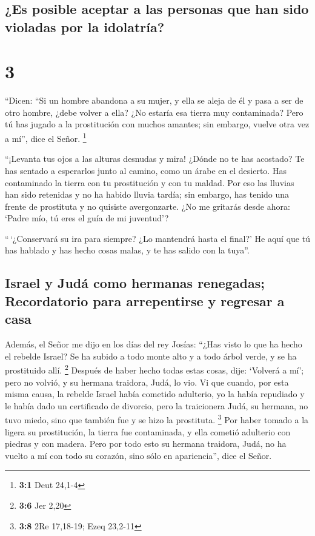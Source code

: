 \begin{paracol}{2}
\hypertarget{es-posible-aceptar-a-las-personas-que-han-sido-violadas-por-la-idolatruxeda}{%
\subsection{¿Es posible aceptar a las personas que han sido violadas por
la
idolatría?}\label{es-posible-aceptar-a-las-personas-que-han-sido-violadas-por-la-idolatruxeda}}

\hypertarget{section-4}{%
\section{3}\label{section-4}}

 ``Dicen: ``Si un hombre abandona a su mujer, y ella se
aleja de él y pasa a ser de otro hombre, ¿debe volver a ella? ¿No
estaría esa tierra muy contaminada? Pero tú has jugado a la prostitución
con muchos amantes; sin embargo, vuelve otra vez a mí'', dice el Señor.
\footnote{\textbf{3:1} Deut 24,1-4}

 ``¡Levanta tus ojos a las alturas desnudas y mira! ¿Dónde
no te has acostado? Te has sentado a esperarlos junto al camino, como un
árabe en el desierto. Has contaminado la tierra con tu prostitución y
con tu maldad.  Por eso las lluvias han sido retenidas y
no ha habido lluvia tardía; sin embargo, has tenido una frente de
prostituta y no quisiste avergonzarte.  ¿No me gritarás
desde ahora: `Padre mío, tú eres el guía de mi juventud'?

 ``\,`¿Conservará su ira para siempre? ¿Lo mantendrá hasta
el final?' He aquí que tú has hablado y has hecho cosas malas, y te has
salido con la tuya''.

\hypertarget{israel-y-juduxe1-como-hermanas-renegadas-recordatorio-para-arrepentirse-y-regresar-a-casa}{%
\subsection{Israel y Judá como hermanas renegadas; Recordatorio para
arrepentirse y regresar a
casa}\label{israel-y-juduxe1-como-hermanas-renegadas-recordatorio-para-arrepentirse-y-regresar-a-casa}}

 Además, el Señor me dijo en los días del rey Josías:
``¿Has visto lo que ha hecho el rebelde Israel? Se ha subido a todo
monte alto y a todo árbol verde, y se ha prostituido allí. \footnote{\textbf{3:6}
  Jer 2,20}  Después de haber hecho todas estas cosas,
dije: `Volverá a mí'; pero no volvió, y su hermana traidora, Judá, lo
vio.  Vi que cuando, por esta misma causa, la rebelde
Israel había cometido adulterio, yo la había repudiado y le había dado
un certificado de divorcio, pero la traicionera Judá, su hermana, no
tuvo miedo, sino que también fue y se hizo la prostituta. \footnote{\textbf{3:8}
  2Re 17,18-19; Ezeq 23,2-11}  Por haber tomado a la
ligera su prostitución, la tierra fue contaminada, y ella cometió
adulterio con piedras y con madera.  Pero por todo esto
su hermana traidora, Judá, no ha vuelto a mí con todo su corazón, sino
sólo en apariencia'', dice el Señor.


\end{paracol}
